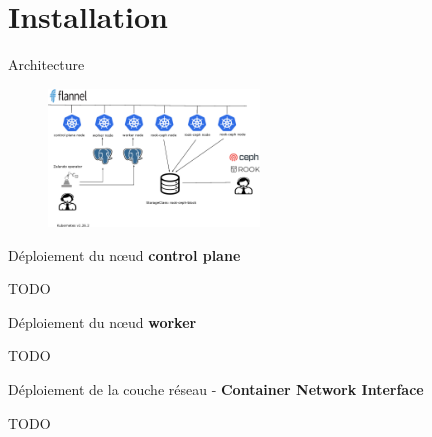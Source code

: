 \section{Installation}


\begin{frame}[fragile]{Architecture}

\begin{figure}
\begin{center}
\includegraphics[angle=0, width=0.5\textwidth]{images/architecture.eps}
\end{center}
\end{figure}

\end{frame}


\begin{frame}[fragile]{Déploiement du n{\oe}ud \textbf{control plane}}

TODO

\end{frame}


\begin{frame}[fragile]{Déploiement du n{\oe}ud \textbf{worker}}

TODO

\end{frame}


\begin{frame}[fragile]{Déploiement de la couche réseau - \textbf{Container Network Interface}}

TODO

\end{frame}


